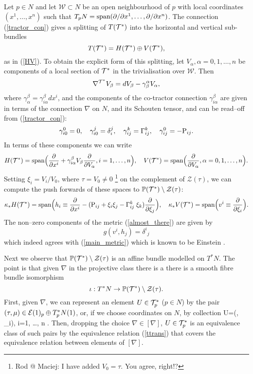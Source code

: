 Let $p\in N$ and let ${\mathcal W}\subset N$ be an open 
neighbourhood of $p$ with 
local coordinates $(x^1, \dots, x^n)$ such that
$T_pN=\mbox{span}(\partial/\partial x^1, \dots, \partial/\partial x^n)$. The connection 
(\ref{tractor_con}) gives a splitting of $T(\mathcal{T}^*)$ into the horizontal and
vertical sub-bundles
\[
T(\mathcal{T}^*)=H(\mathcal{T}^*)\oplus V(\mathcal{T}^*),
\]
as in (\ref{HV}).
To obtain the explicit form of this splitting, let $V_\alpha, \alpha=0, 1, \dots, n$ be components of a local section of $\mathcal{T}^*$ in the trivialisation over ${\mathcal{W}}$.
Then
\[
\nabla^{\mathcal{T}^*} V_\beta=d V_\beta-\gamma_{\beta}^{\alpha} V_\alpha,
\]
where $\gamma_{\alpha}^\beta= \gamma_{i\alpha}^\beta dx^i$, and the components
of the co-tractor connection 
$\gamma_{i\alpha}^\beta$  are given in terms of the connection
$\nabla$ on $N$, and its Schouten tensor, and 
can be read--off from (\ref{tractor_con}):
\[
\gamma_{i0}^0=0, \quad \gamma_{i0}^j=\delta_i^j,\quad
\gamma_{ij}^k=\Gamma_{ij}^k, \quad \gamma_{ij}^0=-\mathrm{P}_{ij}.
\]
In terms of these components we can write
\[
H(\mathcal{T}^*)=\mbox{span}
\Big( \frac{\partial}{\partial x^i}+ {\gamma_{i\alpha}^\beta} V_\beta
\frac{\partial}{\partial V_{\alpha}}, i=1, \dots, n \Big),
\quad V(\mathcal{T}^*)=\mbox{span}\Big(\frac{\partial}{\partial V_{\alpha}}, \alpha=0, 1, 
\dots, n\Big).
\]
Setting $\xi_i=V_i/V_0$, where $\tau=V_0\neq 0$ \footnote{Rod @ Maciej: I have added $V_0=\tau$. You agree, right!?} on the complement of 
$\mathcal{Z}(\tau)$, 
  we can compute the push forwards
of these spaces to $\mathbb{P}(\mathcal{T}^*)\setminus {\mathcal{Z}(\tau)}$:
\[
\kappa_* H(\mathcal{T}^*)=\mbox{span}\Big(h_i\equiv
\frac{\partial}{\partial x^i}-
(\mathrm{P}_{ij}+\xi_i\xi_j  -\Gamma_{ij}^k\;\xi_k)\frac{\partial}{\partial \xi_j}
\Big), \quad \kappa_* V(\mathcal{T}^*)=\mbox{span}\Big(v^i\equiv\frac{\partial}{\partial \xi_i}
\Big).
\]
The non--zero components of the  metric (\ref{almost_there}) are given by
\[
g(v^i, h_j)={\delta^i}_j
\]
which indeed agrees with (\ref{main_metric}) which is known to be Einstein
\cite{DM}.
\koniec

Next we observe that $\mathbb{P}(\mathcal{T}^*)\setminus \mathcal{Z}(\tau)$ is an affine bundle modelled on $T^* N$.
The point is that given
  $\nabla$ in the projective class there is a  there is a smooth fibre bundle isomorphism
  \begin{equation}\label{key-id}
\iota : T^* N\to \mathbb{P}(\mathcal{T}^*)\setminus \mathcal{Z}(\tau).
    \end{equation}
First, given  $\nabla$, we can represent an element $U\in
  \mathcal{T}^*_p$ ($p\in N$) by the pair $(\tau , \mu) \in \mathcal{E} (1)_p\oplus
  T_p^*N(1)$,  or, if we choose coordinates on $N$, by collection
\be
\label{tractor_U}
U=(\tau, \mu_i), \quad i=1, \dots, n .
\ee
  Then, dropping the choice $\nabla \in [\nabla]$, $U\in
  \mathcal{T}^*_p$ is an equivalence class of such pairs by the equivalence
  relation (\ref{ttrans}) that covers the
  equivalence relation between elements of $[\nabla]$. 

